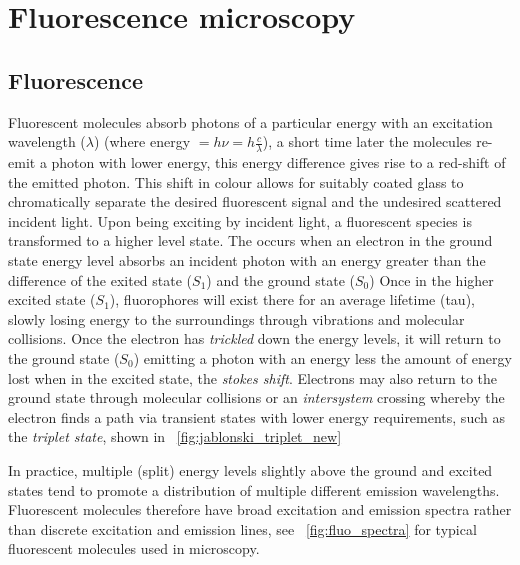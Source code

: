 \section{Fluorescence microscopy}
\subsection{Fluorescence}

Fluorescent molecules absorb photons of a particular energy with an excitation wavelength (\(\lambda \)) (where energy \(= h \nu = h \frac{c}{\lambda}\)), a short time later the molecules re-emit a photon with lower energy, this energy difference gives rise to a red-shift of the emitted photon.
This shift in colour allows for suitably coated glass to chromatically separate the desired fluorescent signal and the undesired scattered incident light.
Upon being exciting by incident light, a fluorescent species is transformed to a higher level state.
The occurs when an electron in the ground state energy level absorbs an incident photon with an energy greater than the difference of the exited state (\(S_1\)) and the ground state (\(S_0\))
Once in the higher excited state (\(S_1\)), \gls{fluorophore}s will exist there for an average lifetime (\gls{tau}), slowly losing energy to the surroundings through vibrations and molecular collisions.
Once the electron has \emph{trickled} down the energy levels, it will return to the ground state (\(S_0 \)) emitting a photon with an energy less the amount of energy lost when in the excited state, the \emph{\Gls{stokes shift}}.
Electrons may also return to the ground state through molecular collisions or an \emph{intersystem} crossing whereby the electron finds a path via transient states with lower energy requirements, such as the \emph{triplet state}, shown in \figurename~\ref{fig:jablonski_triplet_new}

In practice, multiple (split) energy levels slightly above the ground and excited states tend to promote a distribution of multiple different emission wavelengths.
Fluorescent molecules therefore have broad excitation and emission spectra rather than discrete excitation and emission lines, see \figurename~\ref{fig:fluo_spectra} for typical fluorescent molecules used in microscopy.

